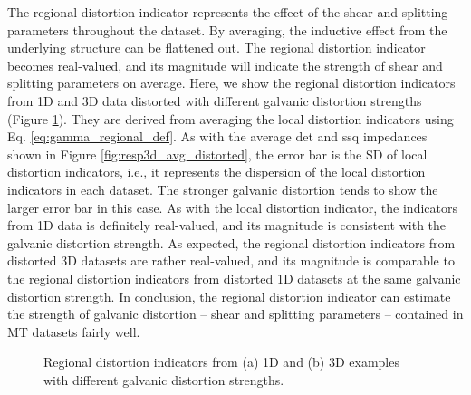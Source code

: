 	The regional distortion indicator represents the effect of the shear and splitting parameters throughout the dataset.
	By averaging, the inductive effect from the underlying structure can be flattened out. The regional distortion indicator becomes real-valued, and its magnitude will indicate the strength of shear and splitting parameters on average.
	Here, we show the regional distortion indicators from 1D and 3D data distorted with different galvanic distortion strengths (Figure \ref{fig:gamma_regional_example}). They are derived from averaging the local distortion indicators using Eq. \eqref{eq:gamma_regional_def}.
	As with the average det and ssq impedances shown in Figure \ref{fig:resp3d_avg_distorted}, the error bar is the SD of local distortion indicators, i.e., it represents the dispersion of the local distortion indicators in each dataset. The stronger galvanic distortion tends to show the larger error bar in this case.
	As with the local distortion indicator, the indicators from 1D data is definitely real-valued, and its magnitude is consistent with the galvanic distortion strength. 
	As expected, the regional distortion indicators from distorted 3D datasets are rather real-valued, and its magnitude is comparable to the regional distortion indicators from distorted 1D datasets at the same galvanic distortion strength.
	In conclusion, the regional distortion indicator can estimate the strength of galvanic distortion -- shear and splitting parameters -- contained in MT datasets fairly well.

\begin{figure}[t]
	\centering
	\caption[Regional distortion indicators from 1D and 3D data distorted with different galvanic distortion strengths]{Regional distortion indicators from (a) 1D and (b) 3D examples with different galvanic distortion strengths.}
	\label{fig:gamma_regional_example}
\end{figure}

